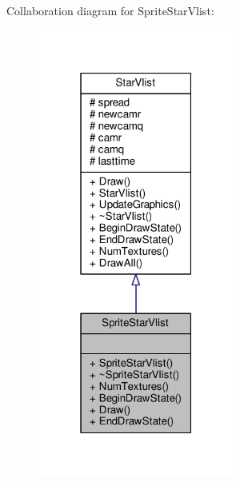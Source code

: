 Collaboration diagram for Sprite\+Star\+Vlist\+:
\nopagebreak
\begin{figure}[H]
\begin{center}
\leavevmode
\includegraphics[width=183pt]{d9/d36/classSpriteStarVlist__coll__graph}
\end{center}
\end{figure}
